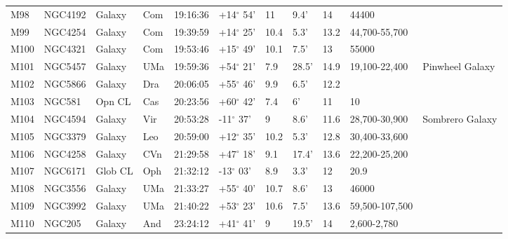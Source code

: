 \begin{longtable}{@{}lllllllllll@{}}
M98        & NGC4192     & Galaxy     & Com       & 19:16:36 & +14$^{\circ}$ 54'  & 11        & 9.4'                 & 14       & 44400               &                                           \\
M99        & NGC4254     & Galaxy     & Com       & 19:39:59 & +14$^{\circ}$ 25'  & 10.4      & 5.3'                 & 13.2     & 44,700-55,700       &                                           \\
M100       & NGC4321     & Galaxy     & Com       & 19:53:46 & +15$^{\circ}$ 49'  & 10.1      & 7.5'                 & 13       & 55000               &                                           \\
M101       & NGC5457     & Galaxy     & UMa       & 19:59:36 & +54$^{\circ}$ 21'  & 7.9       & 28.5'                & 14.9     & 19,100-22,400       & Pinwheel Galaxy                           \\
M102       & NGC5866     & Galaxy     & Dra       & 20:06:05 & +55$^{\circ}$ 46'  & 9.9       & 6.5'                 & 12.2     &                     &                                           \\
M103       & NGC581      & Opn CL     & Cas       & 20:23:56 & +60$^{\circ}$ 42'  & 7.4       & 6'                   & 11       & 10                  &                                           \\
M104       & NGC4594     & Galaxy     & Vir       & 20:53:28 & -11$^{\circ}$ 37'  & 9         & 8.6'                 & 11.6     & 28,700-30,900       & Sombrero Galaxy                           \\
M105       & NGC3379     & Galaxy     & Leo       & 20:59:00 & +12$^{\circ}$ 35'  & 10.2      & 5.3'                 & 12.8     & 30,400-33,600       &                                           \\
M106       & NGC4258     & Galaxy     & CVn       & 21:29:58 & +47$^{\circ}$ 18'  & 9.1       & 17.4'                & 13.6     & 22,200-25,200       &                                           \\
M107       & NGC6171     & Glob CL    & Oph       & 21:32:12 & -13$^{\circ}$ 03'  & 8.9       & 3.3'                 & 12       & 20.9                &                                           \\
M108       & NGC3556     & Galaxy     & UMa       & 21:33:27 & +55$^{\circ}$ 40'  & 10.7      & 8.6'                 & 13       & 46000               &                                           \\
M109       & NGC3992     & Galaxy     & UMa       & 21:40:22 & +53$^{\circ}$ 23'  & 10.6      & 7.5'                 & 13.6     & 59,500-107,500      &                                           \\
M110       & NGC205      & Galaxy     & And       & 23:24:12 & +41$^{\circ}$ 41'  & 9         & 19.5'                & 14       & 2,600-2,780         &                                           \\
\hline
\end{longtable}







